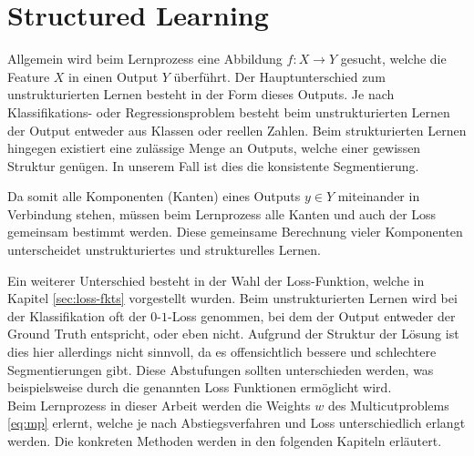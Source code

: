 \section{Structured Learning}\label{sec:strucLearn}

Allgemein wird beim Lernprozess eine Abbildung $f: X \rightarrow Y$ gesucht, welche die Feature $X$ in einen Output $Y$ überführt. Der Hauptunterschied zum unstrukturierten Lernen besteht in der Form dieses Outputs. Je nach Klassifikations- oder Regressionsproblem besteht beim unstrukturierten Lernen der Output entweder aus Klassen oder reellen Zahlen. Beim strukturierten Lernen hingegen existiert eine zulässige Menge an Outputs, welche einer gewissen Struktur genügen. In unserem Fall ist dies die konsistente Segmentierung.
 
Da somit alle Komponenten (Kanten) eines Outputs $y \in Y$ miteinander in Verbindung stehen, müssen beim Lernprozess alle Kanten und auch der Loss gemeinsam bestimmt werden. Diese gemeinsame Berechnung vieler Komponenten unterscheidet unstrukturiertes und strukturelles Lernen.


Ein weiterer Unterschied besteht in der Wahl der Loss-Funktion, welche in Kapitel \ref{sec:loss-fkts} vorgestellt wurden. Beim unstrukturierten Lernen wird bei der Klassifikation oft der $0$-$1$-Loss genommen, bei dem der Output entweder der Ground Truth entspricht, oder eben nicht. Aufgrund der Struktur der Lösung ist dies hier allerdings nicht sinnvoll, da es offensichtlich bessere und schlechtere Segmentierungen gibt. Diese Abstufungen sollten unterschieden werden, was beispielsweise durch die genannten Loss Funktionen ermöglicht wird. \\

Beim Lernprozess in dieser Arbeit werden die Weights $w$ des Multicutproblems \eqref{eq:mp} erlernt, welche je nach Abstiegsverfahren und Loss unterschiedlich erlangt werden. Die konkreten Methoden werden in den folgenden Kapiteln erläutert.  





